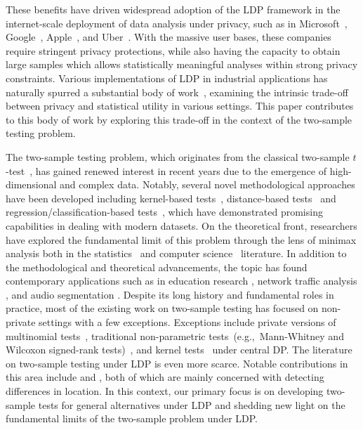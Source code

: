\documentclass[twoside,11pt]{article}
\begin{document}
These benefits have driven widespread adoption of the LDP framework in the internet-scale deployment of data analysis under privacy, such as in
Microsoft~\citep{Ding2017CollectingPrivately},
Google~\citep{erlingsson_rappor_2014},
Apple~\citep{Apple2017Privacy},
and Uber~\citep{Near2017Uber}. With the massive user bases, these companies require stringent privacy protections, while also having the capacity to obtain large samples which allows statistically meaningful analyses within strong privacy constraints. Various implementations of LDP in industrial applications has naturally spurred a substantial body of work~\citep{Acharya2021DifferentiallyCam, Duchi2018MinimaxEstimation, Lam-Weil2021MinimaxConstraint, Lalanne2023on, Tony2021DP}, examining the intrinsic trade-off between privacy and statistical utility in various settings. This paper contributes to this body of work by exploring this trade-off in the context of the two-sample testing problem. 

The two-sample testing problem, which originates from the classical two-sample $t$-test~\citep{Student1908Twosample}, has gained renewed interest in recent years due to the emergence of high-dimensional and complex data.  
Notably, several novel methodological approaches have been developed including kernel-based tests~\citep{Gretton2009FastKernel, Gretton2012ATest}, distance-based tests~\citep{Szekely2004Energy, Szekely2005Energy} and regression/classification-based tests~\citep{kim2019,kim2021}, which have demonstrated promising capabilities in dealing with modern datasets.
On the theoretical front, researchers have explored the fundamental limit of this problem through the lens of minimax analysis both in the statistics~\citep[e.g.,][]{Arias-Castro2018RememberDimension, kim_minimax_2022, Schrab2021MMDTest} and computer science~\citep[e.g.,][]{Batu2000NonprivateTwosample, Chan2014Nonprivate, Diakonikolas2016Nonprivate, Goldreich2000Nonprivate} literature.
In addition to the methodological and theoretical advancements, the topic has found contemporary applications such as in education research \citep{Rabin2019ModelingTests}, network traffic analysis \citep{Kohout2018NetworkTest}, and audio segmentation \citep{Harchaoui2009ASegmentation}.
Despite its long history and fundamental roles in practice, most of the existing work on two-sample testing has focused on non-private settings with a few exceptions. Exceptions include private versions of
multinomial tests~\citep{Acharya2018dPGofTwosample, Aliakbarpour2019PrivatePermutations,Aliakbarpour2018DPgof},
traditional non-parametric tests~(e.g.,~Mann-Whitney and Wilcoxon signed-rank tests)~\cite{Couch2019NonparamTwosample,Task2016Wilcoxon},
and kernel tests~\cite{Raj2020ATest,kim2023dp} under central DP. The literature on two-sample testing under LDP is even more scarce. Notable contributions in this area include \cite{Ding2018TwosampleMean} and \cite{Waudby-Smith2022LDPTwosample}, both of which are mainly concerned with detecting differences in location. In this context, our primary focus is on developing two-sample tests for general alternatives under LDP and shedding new light on the fundamental limits of the two-sample problem under LDP. 
\end{document}
